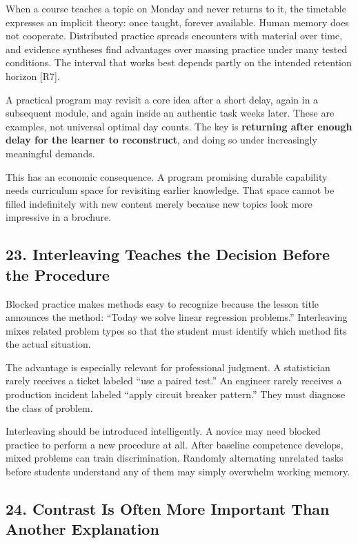 When a course teaches a topic on Monday and never returns to it, the timetable expresses an implicit theory: once taught, forever available. Human memory does not cooperate. Distributed practice spreads encounters with material over time, and evidence syntheses find advantages over massing practice under many tested conditions. The interval that works best depends partly on the intended retention horizon [R7].

A practical program may revisit a core idea after a short delay, again in a subsequent module, and again inside an authentic task weeks later. These are examples, not universal optimal day counts. The key is \textbf{returning after enough delay for the learner to reconstruct}, and doing so under increasingly meaningful demands.

This has an economic consequence. A program promising durable capability needs curriculum space for revisiting earlier knowledge. That space cannot be filled indefinitely with new content merely because new topics look more impressive in a brochure.

\subsection*{23. Interleaving Teaches the Decision Before the Procedure}

Blocked practice makes methods easy to recognize because the lesson title announces the method: ``Today we solve linear regression problems.'' Interleaving mixes related problem types so that the student must identify which method fits the actual situation.

The advantage is especially relevant for professional judgment. A statistician rarely receives a ticket labeled ``use a paired test.'' An engineer rarely receives a production incident labeled ``apply circuit breaker pattern.'' They must diagnose the class of problem.

Interleaving should be introduced intelligently. A novice may need blocked practice to perform a new procedure at all. After baseline competence develops, mixed problems can train discrimination. Randomly alternating unrelated tasks before students understand any of them may simply overwhelm working memory.

\subsection*{24. Contrast Is Often More Important Than Another Explanation}

